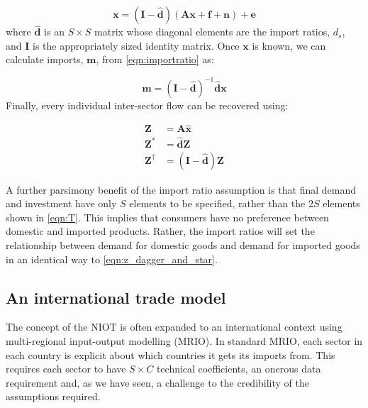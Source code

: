 \documentclass{article}
\begin{document}
\begin{equation}
    \boldsymbol{x} 
    = 
    (\boldsymbol{I} - \boldsymbol{\hat{d}})
    (
    \boldsymbol{Ax} + 
    \boldsymbol{f} + \boldsymbol{n}
    )
    + \boldsymbol{e}
    \label{eqn:xmodel}
\end{equation}
where $\boldsymbol{\hat{d}}$ is an $S \times S$ matrix whose diagonal elements are the import ratios, $d_s$, and $\boldsymbol{I}$ is the appropriately sized identity matrix.
Once $\boldsymbol{x}$ is known, we can calculate imports, $\boldsymbol{m}$, from \cref{eqn:importratio} as:

\begin{equation}
\boldsymbol{m} = 
(\boldsymbol{I} - 
\boldsymbol{\hat{d}})^{-1} 
\boldsymbol{\hat{d}}\boldsymbol{x}\label{eqn:mmodel}
\end{equation}
Finally, every individual inter-sector flow can be recovered using:

\begin{equation}\label{eqn:z_dagger_and_star}
    \begin{aligned}
        \boldsymbol{Z}& = \boldsymbol{A}\boldsymbol{\hat{x}} \\
        \boldsymbol{Z^*}& = \boldsymbol{\hat{d}}\boldsymbol{Z} \\
        \boldsymbol{Z^\dagger}& = (\boldsymbol{I} - \boldsymbol{\hat{d}}) \boldsymbol{Z}
    \end{aligned}
\end{equation}

A further parsimony benefit of the import ratio assumption is that final demand and investment have only $S$ elements to be specified, rather than the $2S$ elements shown in \cref{eqn:T}.
This implies that consumers have no preference between domestic and imported products.
Rather, the import ratios will set the relationship between demand for domestic goods and demand for imported goods in an identical way to \cref{eqn:z_dagger_and_star}.

\subsection{An international trade model}\label{sec:trade}
The concept of the NIOT is often expanded to an international context using multi-regional input-output modelling (MRIO). In standard MRIO, each sector in each country is explicit about which countries it gets its imports from. 
This requires each sector to have $S \times C$ technical coefficients, an onerous data requirement and, as we have seen, a challenge to the credibility of the assumptions required. 
\end{document}
